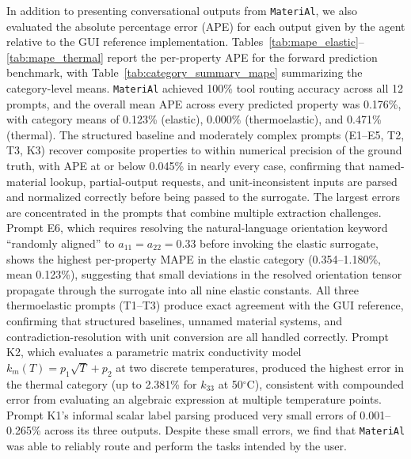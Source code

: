 \documentclass[preprint,review,10pt,number]{elsarticle}
\begin{document}
In addition to presenting conversational outputs from \texttt{MateriAl}, we also evaluated the absolute percentage error (APE) for each output given by the agent relative to the GUI reference implementation. Tables~\ref{tab:mape_elastic}--\ref{tab:mape_thermal} report the per-property APE for the forward prediction benchmark, with Table~\ref{tab:category_summary_mape} summarizing the category-level means.
\texttt{MateriAl} achieved 100\% tool routing accuracy across all 12 prompts, and the overall mean APE across every predicted property was 0.176\%, with category means of 0.123\% (elastic), 0.000\% (thermoelastic), and 0.471\% (thermal). The structured baseline and moderately complex prompts (E1--E5, T2, T3, K3) recover composite properties to within numerical precision of the ground truth, with APE at or below 0.045\% in nearly every case, confirming that named-material lookup, partial-output requests, and unit-inconsistent inputs are parsed and normalized correctly before being passed to the surrogate.
The largest errors are concentrated in the prompts that combine multiple extraction challenges. Prompt E6, which requires resolving the natural-language orientation keyword ``randomly aligned'' to $a_{11} = a_{22} = 0.33$ before invoking the elastic surrogate, shows the highest per-property MAPE in the elastic category (0.354--1.180\%, mean 0.123\%), suggesting that small deviations in the resolved orientation tensor propagate through the surrogate into all nine elastic constants.
All three thermoelastic prompts (T1--T3) produce exact agreement with the GUI reference, confirming that structured baselines, unnamed material systems, and contradiction-resolution with unit conversion are all handled correctly.
Prompt K2, which evaluates a parametric matrix conductivity model $k_m(T) = p_1\sqrt{T} + p_2$ at two discrete temperatures, produced the highest error in the thermal category (up to 2.381\% for $k_{33}$ at 50$^\circ$C), consistent with compounded error from evaluating an algebraic expression at multiple temperature points. Prompt K1's informal scalar label parsing produced very small errors of 0.001--0.265\% across its three outputs.
Despite these small errors, we find that \texttt{MateriAl} was able to reliably route and perform the tasks intended by the user.
\end{document}
